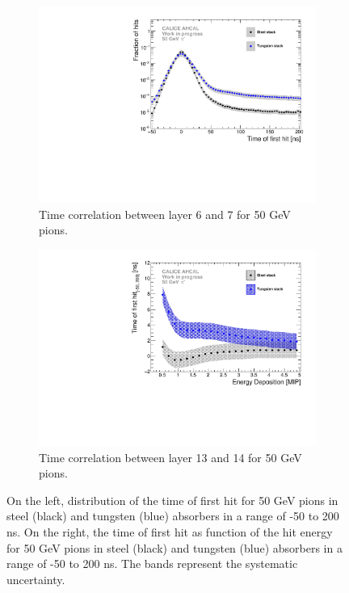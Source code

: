 \begin{figure}[htbp!]
	\begin{subfigure}[t]{0.5\textwidth}
		\centering
		\includegraphics[width=1\textwidth]{../Thesis_Plots/Timing/Pions/Plots/ComparisondNdt_SteelTungsten.pdf}
		\caption{Time correlation between layer 6 and 7 for 50 GeV pions.} \label{fig:dNdt_ComparisonST}
	\end{subfigure}
	\hfill
	\begin{subfigure}[t]{0.5\textwidth}
		\centering
		\includegraphics[width=1\textwidth]{../Thesis_Plots/Timing/Pions/Plots/ComparisonEnergy_SteelTungsten.pdf}
		\caption{Time correlation between layer 13 and 14 for 50 GeV pions.}\label{fig:Energy_ComparisonST}
	\end{subfigure}
	\caption{On the left, distribution of the time of first hit for 50 GeV pions in steel (black) and tungsten (blue) absorbers in a range of -50 to 200 ns. On the right, the time of first hit as function of the hit energy for 50 GeV pions in steel (black) and tungsten (blue) absorbers in a range of -50 to 200 ns. The bands represent the systematic uncertainty.}
\end{figure}

